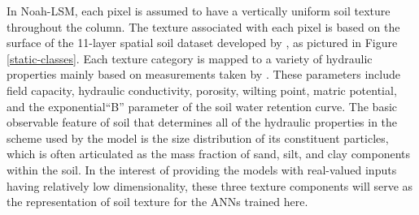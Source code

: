 
In Noah-LSM, each pixel is assumed to have a vertically uniform soil texture throughout the column. The texture associated with each pixel is based on the surface of the 11-layer spatial soil dataset developed by \citep{miller_conterminous_1998}, as pictured in Figure \ref{static-classes}. Each texture category is mapped to a variety of hydraulic properties mainly based on measurements taken by \citep{cosby_statistical_1984}. These parameters include field capacity, hydraulic conductivity, porosity, wilting point, matric potential, and the exponential``B'' parameter of the soil water retention curve. The basic observable feature of soil that determines all of the hydraulic properties in the scheme used by the model is the size distribution of its constituent particles, which is often articulated as the mass fraction of sand, silt, and clay components within the soil. In the interest of providing the models with real-valued inputs having relatively low dimensionality, these three texture components will serve as the representation of soil texture for the ANNs trained here.

